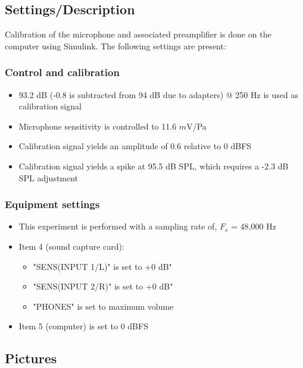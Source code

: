 \subsection{Settings/Description}
\label{SettingsCacellationPath}

Calibration of the microphone and associated preamplifier is done on the computer using Simulink\textsuperscript{\textregistered}. The following settings are present:

\subsubsection{Control and calibration}
\begin{itemize}
	\item 93.2 dB (-0.8 is subtracted from 94 dB due to adapters) $@$ 250 Hz is used as calibration signal
	\item Microphone sensitivity is controlled to 11.6 $m$V/Pa
	\item Calibration signal yields an amplitude of 0.6 relative to 0 dBFS
	\item Calibration signal yields a spike at 95.5 dB SPL, which requires a -2.3 dB SPL adjustment
\end{itemize}

\subsubsection{Equipment settings}
\begin{itemize}
	\item This experiment is performed with a sampling rate of, $F_{s}$ = 48,000 Hz
	\item Item 4 (sound capture card):
		\begin{itemize}
			\item "SENS(INPUT 1/L)" is set to +0 dB"
			\item "SENS(INPUT 2/R)" is set to +0 dB"
			\item "PHONES" is set to maximum volume
		\end{itemize}		
	\item Item 5 (computer) is set to 0 dBFS
\end{itemize}


\subsection{Pictures}

